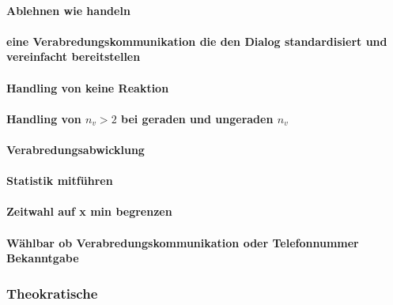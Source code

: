 \paragraph{Ablehnen wie handeln}
\vspace{3cm} 

\paragraph{eine Verabredungskommunikation die den Dialog standardisiert und vereinfacht bereitstellen}
\vspace{3cm} 

\paragraph{Handling von keine Reaktion}
\vspace{3cm} 

\paragraph{Handling von $n_v>2$ bei geraden und ungeraden $n_v$}
\vspace{3cm} 

\paragraph{Verabredungsabwicklung}
\vspace{3cm} 

\paragraph{Statistik mitführen}
\vspace{3cm} 

\paragraph{Zeitwahl auf x min begrenzen}
\vspace{3cm} 

\paragraph{Wählbar ob Verabredungskommunikation oder Telefonnummer Bekanntgabe}
\vspace{3cm} 

\subsubsection{Theokratische}


